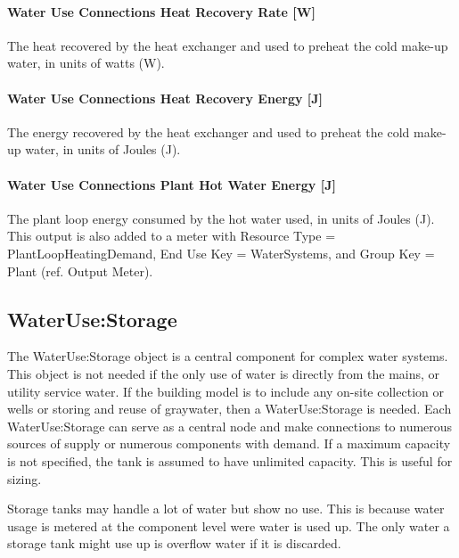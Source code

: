 \paragraph{Water Use Connections Heat Recovery Rate {[}W{]}}\label{water-use-connections-heat-recovery-rate-w}

The heat recovered by the heat exchanger and used to preheat the cold make-up water, in units of watts (W).

\paragraph{Water Use Connections Heat Recovery Energy {[}J{]}}\label{water-use-connections-heat-recovery-energy-j}

The energy recovered by the heat exchanger and used to preheat the cold make-up water, in units of Joules (J).

\paragraph{Water Use Connections Plant Hot Water Energy {[}J{]}}\label{water-use-connections-plant-hot-water-energy-j}

The plant loop energy consumed by the hot water used, in units of Joules (J). This output is also added to a meter with Resource Type = PlantLoopHeatingDemand, End Use Key = WaterSystems, and Group Key = Plant (ref. Output Meter).

\subsection{WaterUse:Storage}\label{waterusestorage}

The WaterUse:Storage object is a central component for complex water systems. This object is not needed if the only use of water is directly from the mains, or utility service water. If the building model is to include any on-site collection or wells or storing and reuse of graywater, then a WaterUse:Storage is needed. Each WaterUse:Storage can serve as a central node and make connections to numerous sources of supply or numerous components with demand. If a maximum capacity is not specified, the tank is assumed to have unlimited capacity. This is useful for sizing.

Storage tanks may handle a lot of water but show no use. This is because water usage is metered at the component level were water is used up. The only water a storage tank might use up is overflow water if it is discarded.

